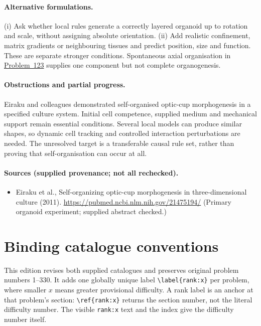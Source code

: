 \documentclass[11pt]{article}
\begin{document}
\paragraph{Alternative formulations.} (i) Ask whether local rules generate a correctly layered organoid up to rotation and scale, without assigning absolute orientation. (ii) Add realistic confinement, matrix gradients or neighbouring tissues and predict position, size and function. These are separate stronger conditions. Spontaneous axial organisation in \href{https://we-solve.github.io/problems/developmental-symmetry-breaking-52f5cb4e/}{Problem~123} supplies one component but not complete organogenesis.
\paragraph{Obstructions and partial progress.} Eiraku and colleagues demonstrated self-organised optic-cup morphogenesis in a specified culture system. Initial cell competence, supplied medium and mechanical support remain essential conditions. Several local models can produce similar shapes, so dynamic cell tracking and controlled interaction perturbations are needed. The unresolved target is a transferable causal rule set, rather than proving that self-organisation can occur at all.
\paragraph{Sources (supplied provenance; not all rechecked).} \begin{itemize}
\item Eiraku et al., Self-organizing optic-cup morphogenesis in three-dimensional culture (2011). \url{https://pubmed.ncbi.nlm.nih.gov/21475194/} (Primary organoid experiment; supplied abstract checked.)
\end{itemize}


\section*{Binding catalogue conventions}
This edition revises both supplied catalogues and preserves original problem numbers 1--330. It adds one globally unique label \verb|\label{rank:x}| per problem, where smaller $x$ means greater provisional difficulty. A rank label is an anchor at that problem's section: \verb|\ref{rank:x}| returns the section number, not the literal difficulty number. The visible \texttt{rank:x} text and the index give the difficulty number itself.
\end{document}
